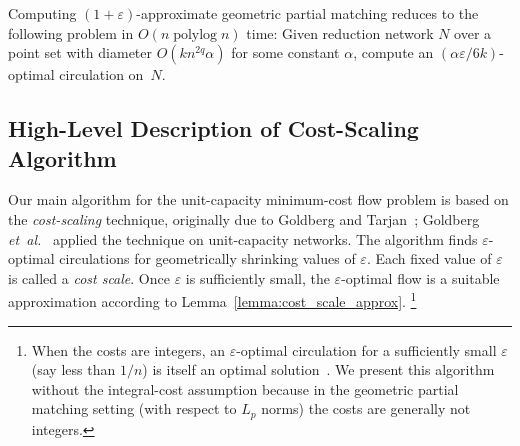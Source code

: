 \documentclass[a4paper,UKenglish]{socg-lipics-v2018}
\def\etal{\emph{et~al.}}
\def\etal{\textit{et~al.}}
\def\polylog{\mathop{\mathrm{polylog}}}
\def\eps{\varepsilon}
\theoremstyle{plain}
\numberwithin{figure}{section}
\def\EMPH#1{\textcolor{BrickRed}{{\emph{#1}}}}
\begin{document}
\begin{lemma}
\label{lemma:cost_scale_approx}
Computing $(1+\eps)$-approximate geometric partial matching reduces to the following problem in $O(n \polylog n)$ time:
Given reduction network $N$ over a point set with diameter $O(kn^{2q} \alpha)$
for some constant $\alpha$, compute an $(\alpha\eps/6k)$-optimal circulation on~$N$.
\end{lemma}


\subsection{High-Level Description of Cost-Scaling Algorithm}
\label{SS:cost-scaling}

Our main algorithm for the unit-capacity minimum-cost flow problem is based on the \EMPH{cost-scaling} technique,
originally due to Goldberg and
Tarjan~\cite{GT90}; Goldberg \etal~\cite{GHKT17} applied the technique on unit-capacity networks.
%
The algorithm finds $\eps$-optimal circulations for geometrically shrinking
values of $\eps$.
Each fixed value of $\eps$ is called a
\EMPH{cost scale}.
Once $\eps$ is sufficiently small, the $\eps$-optimal flow is a suitable
approximation according to Lemma~\ref{lemma:cost_scale_approx}.%
\footnote{When the costs are integers, an $\eps$-optimal circulation for a sufficiently small $\eps$ (say less than $1/n$) is itself an optimal solution~\cite{GT90,GHKT17}.
We present this algorithm without the integral-cost assumption because in the geometric
partial matching setting (with respect to $L_p$ norms) the costs are generally not integers.}

%
\end{document}
